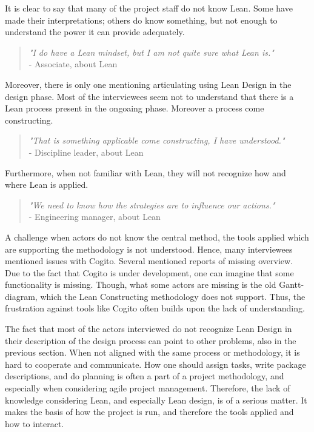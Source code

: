It is clear to say that many of the project staff do not know Lean. Some have made their interpretations; others do know something, but not enough to understand the power it can provide adequately.  

\begin{quote}
    \textit{"I do have a Lean mindset, but I am not quite sure what Lean is."} \\
    - Associate, about Lean 
\end{quote}

Moreover, there is only one mentioning articulating using Lean Design in the design phase. Most of the interviewees seem not to understand that there is a Lean process present in the ongoaing phase. Moreover a process come constructing. 

\begin{quote}
    \textit{"That is something applicable come constructing, I have understood."} \\
    - Discipline leader, about Lean
\end{quote}

Furthermore, when not familiar with Lean, they will not recognize how and where Lean is applied.

\begin{quote}
    \textit{"We need to know how the strategies are to influence our actions."} \\
    - Engineering manager, about Lean
\end{quote}

A challenge when actors do not know the central method, the tools applied which are supporting the methodology is not understood. Hence,  many interviewees mentioned issues with Cogito. Several mentioned reports of missing overview. Due to the fact that Cogito is under development, one can imagine that some functionality is missing. Though,  what some actors are missing is the old Gantt-diagram, which the Lean Constructing methodology does not support. Thus, the frustration against tools like Cogito often builds upon the lack of understanding. 

The fact that most of the actors interviewed do not recognize Lean Design in their description of the design process can point to other problems, also in the previous section. When not aligned with the same process or methodology, it is hard to cooperate and communicate. How one should assign tasks, write package descriptions, and do planning is often a part of a project methodology, and especially when considering agile project management. Therefore, the lack of knowledge considering Lean, and especially Lean design, is of a serious matter. It makes the basis of how the project is run, and therefore the tools applied and how to interact.

